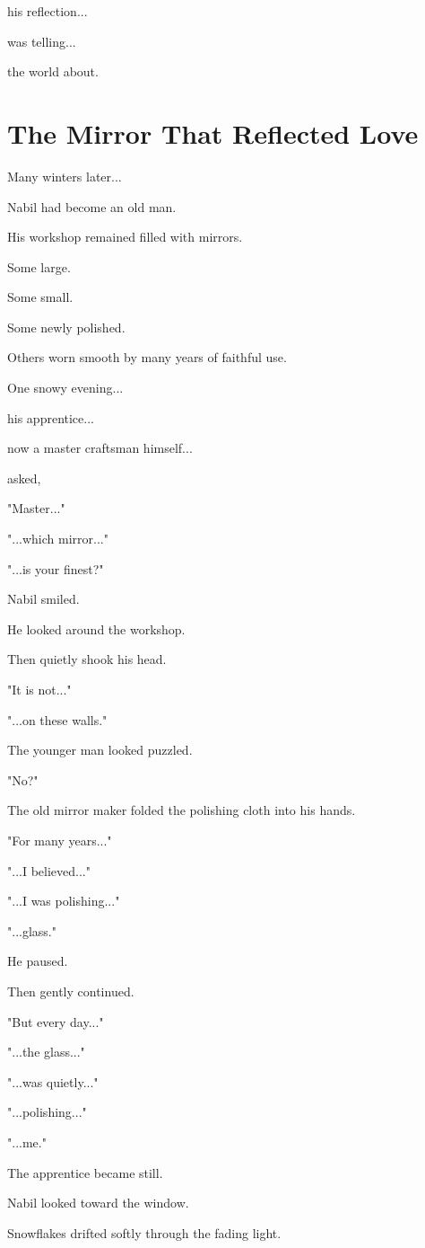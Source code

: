 \documentclass[12pt,openany]{book}
\begin{document}
his reflection...

was telling...

the world about.
\section*{The Mirror That Reflected Love}

Many winters later...

Nabil had become an old man.

His workshop remained filled with mirrors.

Some large.

Some small.

Some newly polished.

Others worn smooth by many years of faithful use.

One snowy evening...

his apprentice...

now a master craftsman himself...

asked,

"Master..."

"...which mirror..."

"...is your finest?"

Nabil smiled.

He looked around the workshop.

Then quietly shook his head.

"It is not..."

"...on these walls."

The younger man looked puzzled.

"No?"

The old mirror maker folded the polishing cloth into his hands.

"For many years..."

"...I believed..."

"...I was polishing..."

"...glass."

He paused.

Then gently continued.

"But every day..."

"...the glass..."

"...was quietly..."

"...polishing..."

"...me."

The apprentice became still.

Nabil looked toward the window.

Snowflakes drifted softly through the fading light.
\end{document}
